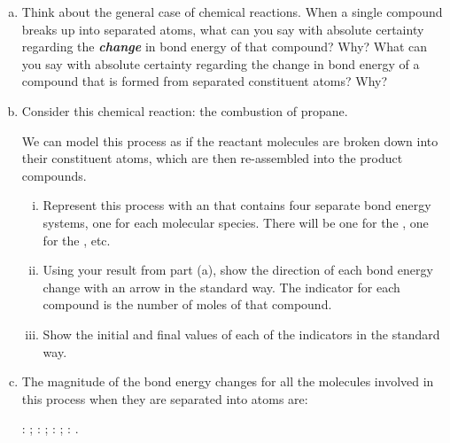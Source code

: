 \label{fnt1.1.4-2}

\begin{enumerate}[(a)]
	\item Think about the general case of chemical reactions. When a single compound breaks up into separated atoms, what can you say with absolute certainty regarding the \textbf{\em change} in bond energy of that compound? Why? What can you say with absolute certainty regarding the change in bond energy of a compound that is formed from separated constituent atoms? Why?
	
	\item Consider this chemical reaction: the combustion of propane.
	\begin{center}
	\end{center}
	We can model this process as if the reactant molecules are broken down into their constituent atoms, which are then re-assembled into the product compounds.

	\begin{enumerate}[i.]
		\item Represent this process with an \EnergyDiagram{} that contains four separate bond energy systems, one for each molecular species. There will be one for the , one for the , etc.
	
		\item Using your result from part (a), show the direction of each bond energy change with an arrow in the standard way. The indicator for each compound is the number of moles of that compound.
		
		\item Show the initial and final values of each of the indicators in the standard way.
	\end{enumerate}
	
	\item The magnitude of the bond energy changes for all the molecules involved in this process when they are separated into atoms are:

	\begin{center}
	: ; \;
	: ; \; 
	: ; \;
	: .
	\end{center}
	

\end{enumerate}
